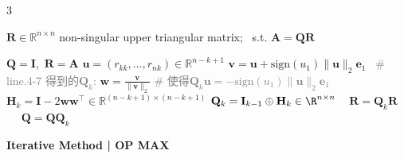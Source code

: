 \documentclass{note}
\begin{document}
\begin{multicols}{3}
\begin{algorithm}[H]
\qquad\qquad $\mathbf{R} \in \mathbb{R}^{n \times n}$ non-singular upper triangular matrix; \ s.t. $\mathbf{A} = \mathbf{Q}\mathbf{R}$
\begin{algorithmic}[1]
  \State $\mathbf{Q} = \mathbf{I}$,\ $\mathbf{R} = \mathbf{A}$ \quad {}
    \State $\mathbf{u} = (r_{kk}, \dots, r_{nk})\in \mathbb{R}^{n-k+1}$
    \State $\mathbf{v} = \mathbf{u} + \mathrm{sign}(u_1)\|\mathbf{u}\|_2 \mathbf{e}_1$  \quad \textcolor{gray}{\tiny \quad \ \# line.4-7 得到的$\mathbf{Q}_k$:}
    \State $\mathbf{w} = \frac{\mathbf{v}}{\|\mathbf{v}\|_2}$  \qquad\qquad\qquad\quad \textcolor{gray}{\tiny \qquad \# 使得$\mathbf{Q}_k\mathbf{u}=-\text{sign}(u_1)\|\mathbf{u}\|_2\mathbf{e}_1$}
    \State $\mathbf{H}_k = \mathbf{I} - 2\mathbf{w}\mathbf{w}^\top\in \mathbb{R}^{(n-k+1) \times (n-k+1)}$ \quad \textcolor{gray}{}
    \State $\mathbf{Q}_k = \mathbf{I}_{k-1} \oplus \mathbf{H}_k\in\R^{n\times n}$ \ \textcolor{gray}{}
    \State $\mathbf{R} = \mathbf{Q}_k \mathbf{R}$ \ \ \textcolor{gray}{}
    \State $\mathbf{Q} = \mathbf{Q} \mathbf{Q}_k$ \ \ \textcolor{green}{}
  \EndFor \quad {}
\end{algorithmic}
\end{algorithm}

\end{multicols}
\vspace{-27pt}


\textbf{\scriptsize Iterative Method | OP  MAX}

\vspace{-11pt}
\end{document}
